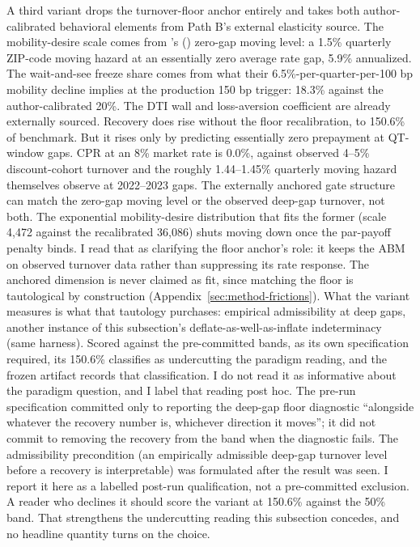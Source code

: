 \documentclass[12pt]{article}
\newcommand{\citepos}[1]{\citeauthor{#1}'s (\citeyear{#1})}
\begin{document}
A third variant drops the turnover-floor anchor entirely and takes both author-calibrated behavioral elements from Path B's external elasticity source. The mobility-desire scale comes from \citepos{liebersohn2024} zero-gap moving level: a 1.5\% quarterly ZIP-code moving hazard at an essentially zero average rate gap, 5.9\% annualized. The wait-and-see freeze share comes from what their 6.5\%-per-quarter-per-100 bp mobility decline implies at the production 150 bp trigger: 18.3\% against the author-calibrated 20\%. The DTI wall and loss-aversion coefficient are already externally sourced. Recovery does rise without the floor recalibration, to 150.6\% of benchmark. But it rises only by predicting essentially zero prepayment at QT-window gaps. CPR at an 8\% market rate is 0.0\%, against observed 4--5\% discount-cohort turnover and the roughly 1.44--1.45\% quarterly moving hazard \citet{liebersohn2024} themselves observe at 2022--2023 gaps. The externally anchored gate structure can match the zero-gap moving level or the observed deep-gap turnover, not both. The exponential mobility-desire distribution that fits the former (scale 4{,}472 against the recalibrated 36{,}086) shuts moving down once the par-payoff penalty binds. I read that as clarifying the floor anchor's role: it keeps the ABM on observed turnover data rather than suppressing its rate response. The anchored dimension is never claimed as fit, since matching the floor is tautological by construction (Appendix~\ref{sec:method-frictions}). What the variant measures is what that tautology purchases: empirical admissibility at deep gaps, another instance of this subsection's deflate-as-well-as-inflate indeterminacy (same harness). Scored against the pre-committed bands, as its own specification required, its 150.6\% classifies as undercutting the paradigm reading, and the frozen artifact records that classification. I do not read it as informative about the paradigm question, and I label that reading post hoc. The pre-run specification committed only to reporting the deep-gap floor diagnostic ``alongside whatever the recovery number is, whichever direction it moves''; it did not commit to removing the recovery from the band when the diagnostic fails. The admissibility precondition (an empirically admissible deep-gap turnover level before a recovery is interpretable) was formulated after the result was seen. I report it here as a labelled post-run qualification, not a pre-committed exclusion. A reader who declines it should score the variant at 150.6\% against the 50\% band. That strengthens the undercutting reading this subsection concedes, and no headline quantity turns on the choice.
\end{document}
